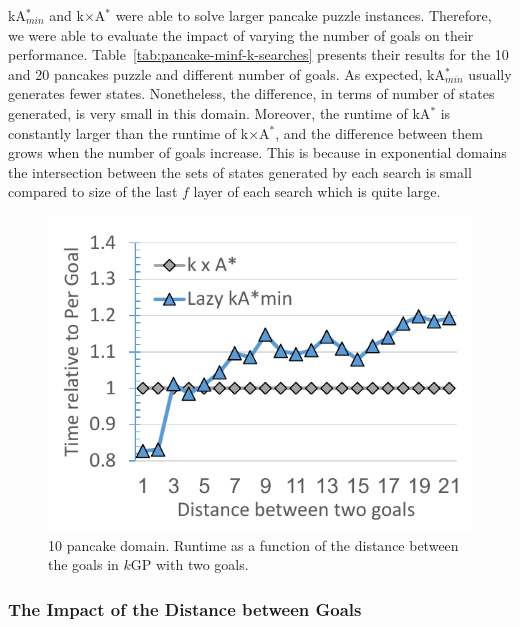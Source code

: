 \documentclass{aicom2e}
\newcommand{\kgs}{$k$GP}
\newcommand{\kastar}{kA$^*$}
\newcommand{\kastarmin}{kA$^*_{min}$}
\newcommand{\kxastar}{k$\times$A$^*$}
\newcommand{\roni}[1]{\textbf{[RS:#1]}}
\begin{document}
\kastarmin{} and \kxastar{} were able to solve larger pancake puzzle instances.
Therefore, we were able to evaluate  the impact of varying the number of goals
on their performance. Table~\ref{tab:pancake-minf-k-searches} presents their
results for the 10 and 20 pancakes puzzle and different number of goals. As
expected, \kastarmin{} usually generates fewer states. Nonetheless, the
difference, in terms of number of states generated, is very small in this
domain.  Moreover, the runtime of \kastar{} is constantly larger than the
runtime of \kxastar{}, and the difference between them grows when the number of
goals increase. This is because in exponential domains the intersection between
the sets of states generated by each search is small compared to size of the
last $f$ layer of each search which is quite large. 



\begin{figure}
    \includegraphics[width=\columnwidth]{pancake-goal-distance_cropped.pdf}
    \caption{10 pancake domain. Runtime as a function of the distance between the goals in \kgs{} with two goals.}
    \label{fig:2-goal-pancake}
\end{figure}

\subsubsection{The Impact of the Distance between Goals}
\end{document}
